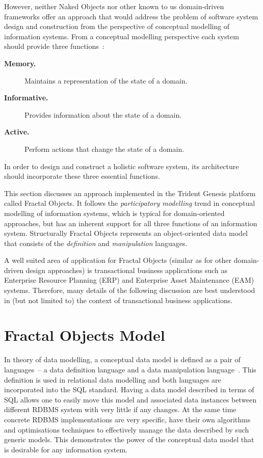   However, neither Naked Objects nor other known to us domain-driven frameworks offer an approach that would address the problem of software system design and construction from the perspective of conceptual modelling of information systems.
  From a conceptual modelling perspective each system should provide three functions~\cite{oli2007}: 
  \begin{description}
    \item[\textbf{Memory.}] Maintains a representation of the state of a domain.
    \item[\textbf{Informative.}] Provides information about the state of a domain.
    \item[\textbf{Active.}] Perform actions that change the state of a domain. 
  \end{description} 
  In order to design and construct a holistic software system, its architecture should incorporate these three essential functions.

  This section discusses an approach implemented in the Trident Genesis platform called Fractal Objects. 
  It follows the \emph{participatory modelling} trend in conceptual modelling of information systems, which is typical for domain-oriented approaches, but has an inherent support for all three functions of an information system.  
  Structurally Fractal Objects represents an object-oriented data model that consists of the \emph{definition} and \emph{manipulation} languages.
  
  A well suited area of application for Fractal Objects (similar as for other domain-driven design approaches) is transactional business applications such as Enterprise Resource Planning (ERP) and Enterprise Asset Maintenance (EAM) systems.
  Therefore, many details of the following discussion are best understood in (but not limited to) the context of transactional business applications.
  
\section{Fractal Objects Model}

  In theory of data modelling, a conceptual data model is defined as a pair of languages~-- a data definition language and a data manipulation language~\cite{kal1983}.
  This definition is used in relational data modelling and both languages are incorporated into the SQL standard.
  Having a data model described in terms of SQL allows one to easily move this model and associated data instances between different RDBMS system with very little if any changes.
  At the same time concrete RDBMS implementations are very specific, have their own algorithms and optimisations techniques to effectively manage the data described by such generic models.
  This demonstrates the power of the conceptual data model that is desirable for any information system.
  
